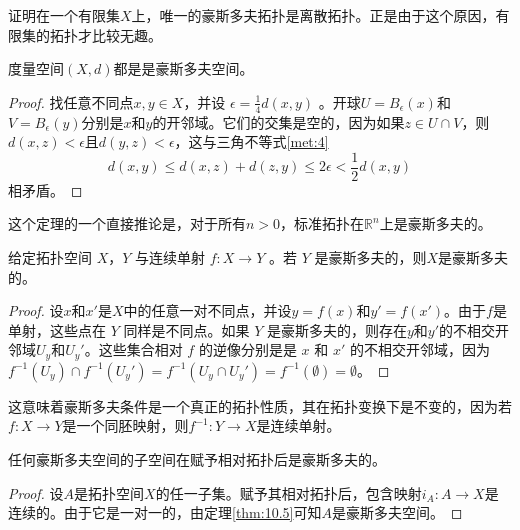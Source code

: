 \begin{theorem}
\begin{theorem}
\begin{exercise}
	证明在一个有限集$X$上，唯一的豪斯多夫拓扑是离散拓扑。正是由于这个原因，有限集的拓扑才比较无趣。
\end{exercise}

\begin{theorem}\label{eg:10.4}
	度量空间$(X,d)$都是是豪斯多夫空间。
\end{theorem}

\begin{proof}
	找任意不同点$x,y\in X$，并设 $\epsilon =\frac{1}{4} d(x,y)$ 。开球$U=B_{\epsilon } (x)$和$V=B_{\epsilon } (y)$分别是$x$和$y$的开邻域。它们的交集是空的，因为如果$z\in U\cap V$，则$d(x,z)< \epsilon $且$d(y,z)< \epsilon $，这与三角不等式\ref{met:4}
\begin{equation*}
    d(x,y)\leq d(x,z)+d(z,y)\leq 2\epsilon < \frac{1}{2} d(x,y)
\end{equation*}
相矛盾。
\end{proof}

这个定理的一个直接推论是，对于所有$n >0$，标准拓扑在$\mathbb{R}^{n}$上是豪斯多夫的。

\begin{theorem}\label{eg:10.5}
	给定拓扑空间 $X$，$Y$ 与连续单射 $f:X\rightarrow Y$ 。若 $Y$ 是豪斯多夫的，则$X$是豪斯多夫的。
\end{theorem}

\begin{proof}
	设$x$和$x'$是$X$中的任意一对不同点，并设$y=f(x)$和$y'=f(x')$。由于$f$是单射，这些点在 $Y$ 同样是不同点。如果 $Y$ 是豪斯多夫的，则存在$y$和$y'$的不相交开邻域$U_{y}$和$U_{y} '$。这些集合相对 $f$ 的逆像分别是是 $x$ 和 $x'$ 的不相交开邻域，因为$f^{-1} (U_{y} )\cap f^{-1} (U_{y} ')=f^{-1} (U_{y} \cap U_{y} ')=f^{-1} (\emptyset )=\emptyset $。
\end{proof}

	这意味着豪斯多夫条件是一个真正的拓扑性质，其在拓扑变换下是不变的，因为若$f:X\rightarrow Y$是一个同胚映射，则$f^{-1} :Y\rightarrow X$是连续单射。

\begin{corollary}\label{eg:10.6}
	任何豪斯多夫空间的子空间在赋予相对拓扑后是豪斯多夫的。
\end{corollary}

\begin{proof}
	设$A$是拓扑空间$X$的任一子集。赋予其相对拓扑后，包含映射$i_{A} :A\rightarrow X$是连续的。由于它是一对一的，由定理\ref{thm:10.5}可知$A$是豪斯多夫空间。
\end{proof}


\end{theorem}
\end{theorem}
